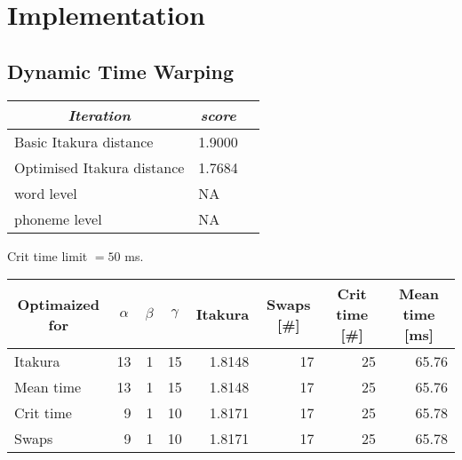 \chapter{Implementation} %
\label{cha:implementation}


\section{Dynamic Time Warping} %
\label{imp:dynamic_time_warping}

\begin{table}[htbp]
	\begin{center}
		\begin{tabular}{lll}
			\toprule
			\multicolumn{1}{c}{\emph{Iteration}} & \multicolumn{1}{c}{\emph{score}} \\
			\midrule
			Basic Itakura distance & 1.9000 \\
			Optimised Itakura distance & 1.7684 \\
			word level & NA \\
			phoneme level & NA \\
			\bottomrule			
		\end{tabular}		
	\end{center}
\label{tab:dtw_accuracy}	
\end{table}

Crit time limit $=50$ ms.

\begin{table}[htbp]
	\begin{center}
		\begin{tabular}{l|rrr|rrrr}
			\toprule
			\multicolumn{1}{c}{Optimaized for} & \multicolumn{1}{c}{$\alpha$} & \multicolumn{1}{c}{$\beta$} & \multicolumn{1}{c}{$\gamma$} & \multicolumn{1}{c}{Itakura} & \multicolumn{1}{c}{Swaps [\#]} & \multicolumn{1}{c}{Crit time [\#]} & \multicolumn{1}{c}{Mean time [ms]}\\
			\midrule
			Itakura & 13 & 1 & 15 & 1.8148 & 17 & 25 & 65.76\\
			Mean time & 13 & 1 & 15 & 1.8148 & 17 & 25 & 65.76\\
			Crit time & 9 & 1 & 10 & 1.8171 & 17 & 25 & 65.78\\
			Swaps & 9 & 1 & 10 & 1.8171 & 17 & 25 & 65.78\\
			\bottomrule			
		\end{tabular}		
	\end{center}
\label{tab:local_constraints}	
\end{table}


